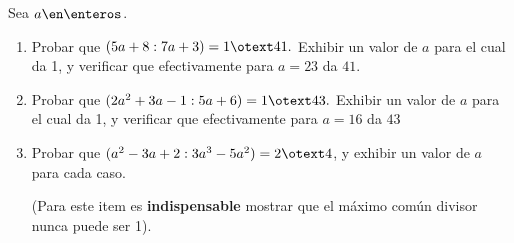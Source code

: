 \begin{enunciado}{\ejercicio}
  Sea $a \en \enteros$.
  \begin{enumerate}[label=\alph*)]
    \item Probar que
          $(5a + 8 : 7a + 3) = 1 \otext 41.$
          Exhibir un valor de $a$ para el cual da 1, y verificar
          que efectivamente para $a = 23$ da $41$.

    \item Probar que $(2 a^2 + 3a -1 : 5a +6) = 1 \otext 43.$ Exhibir un valor de $a$ para el cual da 1, y verificar
          que efectivamente para $a = 16$ da $43$

    \item Probar que $(a^2-3a+2 : 3a^3 -5a^2) = 2 \otext 4$, y exhibir un valor de $a$ para cada caso.

          (Para este item es \textbf{indispensable} mostrar que el máximo común divisor nunca puede ser 1).
  \end{enumerate}
\end{enunciado}

